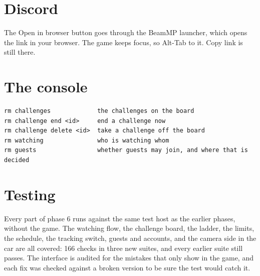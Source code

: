 \documentclass[11pt,a4paper]{article}
\begin{document}
\section{Discord}

The Open in browser button goes through the BeamMP launcher, which opens
the link in your browser. The game keeps focus, so Alt-Tab to it. Copy
link is still there.

\section{The console}

\begin{lstlisting}
rm challenges             the challenges on the board
rm challenge end <id>     end a challenge now
rm challenge delete <id>  take a challenge off the board
rm watching               who is watching whom
rm guests                 whether guests may join, and where that is decided
\end{lstlisting}

\section{Testing}

Every part of phase 6 runs against the same test host as the earlier
phases, without the game. The watching flow, the challenge board, the
ladder, the limits, the schedule, the tracking switch, guests and
accounts, and the camera side in the car are all covered: 166 checks in
three new suites, and every earlier suite still passes. The interface is
audited for the mistakes that only show in the game, and each fix was
checked against a broken version to be sure the test would catch it.
\end{document}
